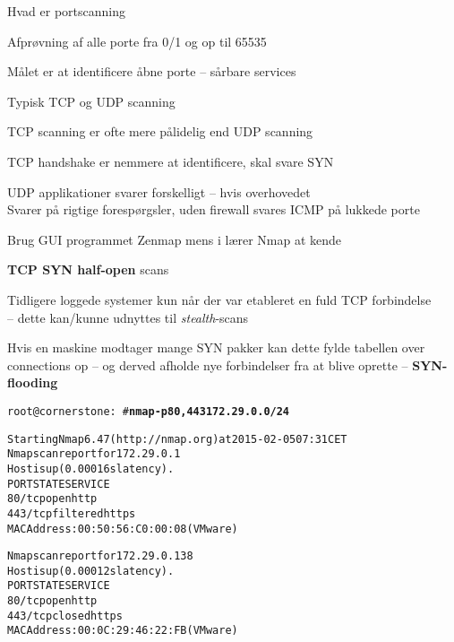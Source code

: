 \documentclass[Screen16to9,17pt]{foils}
\begin{document}

\begin{list1}
\item Hvad er portscanning
\item Afprøvning af alle porte fra 0/1 og op til 65535
\item Målet er at identificere åbne porte -- sårbare services
\item Typisk TCP og UDP scanning
\item TCP scanning er ofte mere pålidelig end UDP scanning
\item TCP handshake er nemmere at identificere, skal svare SYN
\item UDP applikationer svarer forskelligt -- hvis overhovedet\\
Svarer på rigtige forespørgsler, uden firewall svares ICMP på lukkede porte
\item Brug GUI programmet Zenmap mens i lærer Nmap at kende
\end{list1}




\begin{list2}
\item {\bfseries TCP SYN half-open} scans
\item Tidligere loggede systemer kun når der var etableret en fuld TCP
  forbindelse\\
  -- dette kan/kunne udnyttes til \emph{stealth}-scans
\item Hvis en maskine modtager mange SYN pakker kan dette fylde
  tabellen over connections op -- og derved afholde nye forbindelser
  fra at blive oprette -- {\bfseries SYN-flooding}
\end{list2}



\begin{alltt}\small
root@cornerstone:~#{\bfseries  nmap -p80,443 172.29.0.0/24}

Starting Nmap 6.47 ( http://nmap.org ) at 2015-02-05 07:31 CET
Nmap scan report for 172.29.0.1
Host is up (0.00016s latency).
PORT    STATE    SERVICE
{\color{darkgreen}80/tcp  open     http}
443/tcp filtered https
MAC Address: 00:50:56:C0:00:08 (VMware)

Nmap scan report for 172.29.0.138
Host is up (0.00012s latency).
PORT    STATE  SERVICE
{\color{darkgreen}80/tcp  open   http}
443/tcp closed https
MAC Address: 00:0C:29:46:22:FB (VMware)

\end{alltt}
\end{document}
